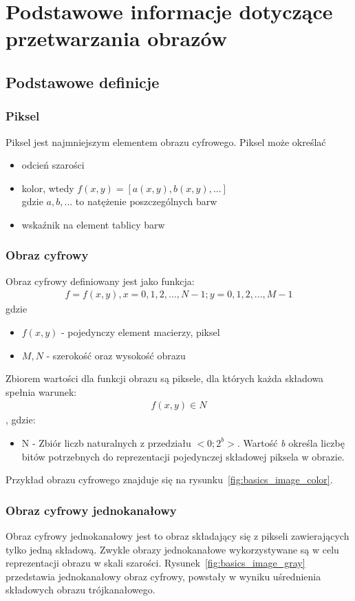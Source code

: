 \section{Podstawowe informacje dotyczące przetwarzania obrazów}
\subsection{Podstawowe definicje}
\subsubsection{Piksel}
Piksel jest najmniejszym elementem obrazu cyfrowego. Piksel może określać
\begin{itemize}
\item odcień szarości
\item kolor, wtedy \(f(x, y) = [a(x, y), b(x, y),...]\)\\
  gdzie $a, b,...$ to natężenie poszczególnych barw
\item wskaźnik na element tablicy barw
\end{itemize}
\subsubsection{Obraz cyfrowy}
Obraz cyfrowy definiowany jest jako funkcja:
\begin{gather*}
  f = f(x, y), x = 0,1,2,...,N-1; y = 0,1,2,...,M-1
\end{gather*}
gdzie
\begin{itemize}
\item \(f(x, y)\) - pojedynczy element macierzy, piksel
\item \(M, N\) - szerokość oraz wysokość obrazu
\end{itemize}
Zbiorem wartości dla funkcji obrazu są piksele, dla których każda składowa spełnia warunek:
\begin{gather*}
  f(x, y) \in N
\end{gather*}, gdzie:
\begin{itemize}
\item N - Zbiór liczb naturalnych z przedziału $<0; 2^b>$. Wartość \textit{b} określa liczbę bitów potrzebnych do reprezentacji pojedynczej składowej piksela w obrazie.
\end{itemize}
Przykład obrazu cyfrowego znajduje się na rysunku~\ref{fig:basics_image_color}.
\subsubsection{Obraz cyfrowy jednokanałowy}
Obraz cyfrowy jednokanałowy jest to obraz składający się z pikseli zawierających tylko jedną składową. Zwykle obrazy jednokanałowe wykorzystywane są w celu reprezentacji obrazu w skali szarości. Rysunek~\ref{fig:basics_image_gray} przedstawia jednokanałowy obraz cyfrowy, powstały w wyniku uśrednienia składowych obrazu trójkanałowego.

